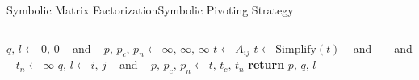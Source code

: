 \begin{frame}{Symbolic Matrix Factorization}{Symbolic Pivoting Strategy}
\begin{columns}
\begin{column}[c]{0.6\textwidth}
\begin{algorithmic}
          \EndFor
          \State {} %
          \State $q, \, l \gets \, 0, \, 0$  ~ and ~ %
          $p, \, p_c, \, p_n \gets \infty, \, \infty, \, \infty$ %
            \State $t \gets A_{ij}$ %
            \State $t \gets \text{Simplify}(t)$ ~ and ~ %
             ~ and ~ %
            $t_n \gets \infty$ %
              \State $q, \, l \gets i, \, j$ ~ and ~ %
              $p, \, p_c, \, p_n \gets t, \, t_c, \, t_n$ %
            \EndIf
          \EndFor
          \State \textbf{return} $p, \, q, \, l$ %
        \EndProcedure
      \end{algorithmic}
    \end{column}
  \end{columns}
\end{frame}


